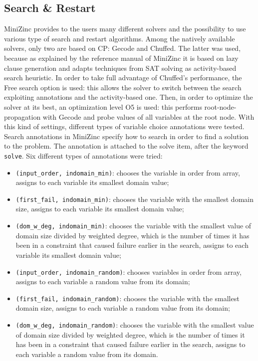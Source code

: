 \documentclass[a4paper, 12pt]{article}
\begin{document}
 
\subsection{Search \& Restart}
MiniZinc provides to the users many different solvers and the possibility to use various type of search and restart algorithms. Among the natively available solvers, only two are based on CP: Gecode and Chuffed. The latter was used, because as explained by the reference manual of MiniZinc it is based on lazy clause generation and adapts techniques from SAT solving as activity-based search heuristic. In order to take full advantage of Chuffed’s performance, the Free search option is used: this allows the solver to switch between the search exploiting annotations and the activity-based one. Then, in order to optimize the solver at its best, an optimization level O5 is used: this performs root-node-propagation with Gecode and probe values of all variables at the root node. With this kind of settings, different types of variable choice annotations were tested. Search annotations in MiniZinc specify how to search in order to find a solution to the problem. The annotation is attached to the solve item, after the keyword \verb|solve|. Six different types of annotations were tried:
\begin{itemize}
	\item \verb|(input_order, indomain_min)|: chooses the variable in order from array, assigns to each variable its smallest domain value;
	\item \verb|(first_fail, indomain_min)|: chooses the variable with the smallest domain size, assigns to each variable its smallest domain value;
	\item \verb|(dom_w_deg, indomain_min)|: chooses the variable with the smallest value of domain size divided by weighted degree, which is the number of times it has been in a constraint that caused failure earlier in the search, assigns to each variable its smallest domain value;
	\item \verb|(input_order, indomain_random)|: chooses variables in order from array, assigns to each variable a random value from its domain;
	\item \verb|(first_fail, indomain_random)|: chooses the variable with the smallest domain size, assigns to each variable a random value from its domain;
	\item \verb|(dom_w_deg, indomain_random)|: chooses the variable with the smallest value of domain size divided by weighted degree, which is the number of times it has been in a constraint that caused failure earlier in the search, assigns to each variable a random value from its domain.
\end{itemize}
\end{document}
